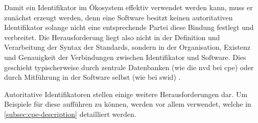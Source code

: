 Damit ein Identifikator im Ökosystem effektiv verwendet werden kann, muss er zunächst erzeugt werden, denn eine Software besitzt keinen autoritativen Identifikator solange nicht eine entsprechende Partei diese Bindung festlegt und verbreitet.
Die Herausforderung liegt also nicht in der Definition und Verarbeitung der Syntax der Standards, sondern in der Organisation, Existenz und Genauigkeit der Verbindungen zwischen Identifikator und Software.
Dies geschieht typischerweise durch zentrale Datenbanken (wie die \acrshort{nvd} bei \acrshort{cpe}) oder durch Mitführung in der Software selbst (wie bei \acrfull{swid}) \autocite{CISA2023}.

Autoritative Identifikatoren stellen einige weitere Herausforderungen dar.
Um Beispiele für diese aufführen zu können, werden vor allem  verwendet, welche in \autoref{subsec:cpe-description} detailliert werden.

